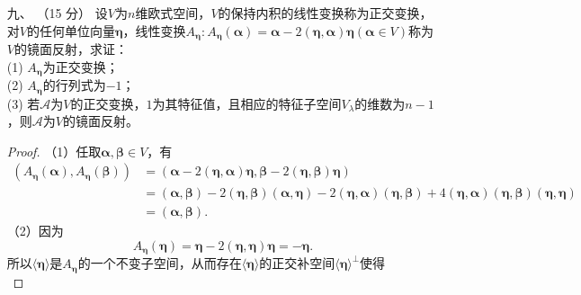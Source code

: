\begin{enumerate}[1~]
\item[九、]（15 分）
设$V$为$n$维欧式空间，$V$的保持内积的线性变换称为正交变换，对$V$的任何单位向量$\boldsymbol{\eta}$，线性变换$A _ { \boldsymbol{\eta} }: A _ { \boldsymbol{\eta} } ( \boldsymbol{\alpha} ) = \boldsymbol{\alpha} - 2 ( \boldsymbol{\eta} , \boldsymbol{\alpha} ) \boldsymbol{\eta} ( \boldsymbol{\alpha} \in V )$称为$V$的镜面反射，求证：\\
(1) $A_{\boldsymbol{\eta}}$为正交变换；\\
(2) $A_{\boldsymbol{\eta}}$的行列式为$-1$；\\
(3) 若$\mathscr{A}$为$V$的正交变换，$1$为其特征值，且相应的特征子空间$V_{\lambda}$的维数为$n-1$，则$\mathscr{A}$为$V$的镜面反射。
\begin{proof}
（1）任取$\boldsymbol{\alpha}, \boldsymbol{\beta}\in V$，有\begin{align*}
(A_{\boldsymbol{\eta}}(\boldsymbol{\alpha}), A_{\boldsymbol{\eta}}(\boldsymbol{\beta}))&=(\boldsymbol{\alpha}-2(\boldsymbol{\eta}, \boldsymbol{\alpha})\boldsymbol{\eta}, \boldsymbol{\beta}-2(\boldsymbol{\eta}, \boldsymbol{\beta})\boldsymbol{\eta})\\
&=(\boldsymbol{\alpha}, \boldsymbol{\beta})-2(\boldsymbol{\eta}, \boldsymbol{\beta})(\boldsymbol{\alpha}, \boldsymbol{\eta})-2(\boldsymbol{\eta}, \boldsymbol{\alpha})(\boldsymbol{\eta}, \boldsymbol{\beta})+4(\boldsymbol{\eta}, \boldsymbol{\alpha})(\boldsymbol{\eta}, \boldsymbol{\beta})(\boldsymbol{\eta}, \boldsymbol{\eta})\\
&=(\boldsymbol{\alpha}, \boldsymbol{\beta}).
\end{align*}
（2）因为\[
A_{\boldsymbol{\eta}}(\boldsymbol{\eta})=\boldsymbol{\eta}-2(\boldsymbol{\eta}, \boldsymbol{\eta})\boldsymbol{\eta}=-\boldsymbol{\eta}.
\]
所以$\langle \boldsymbol{\eta} \rangle$是$A_{\boldsymbol{\eta}}$的一个不变子空间，从而存在$\langle \boldsymbol{\eta} \rangle$的正交补空间$\langle \boldsymbol{\eta} \rangle^{\bot}$使得\[
\]
\end{proof}
\end{enumerate}
